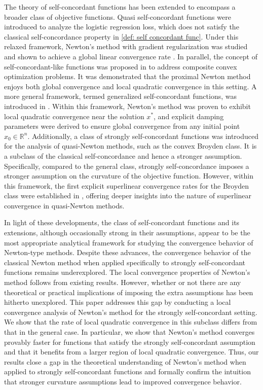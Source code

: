\documentclass[sn-mathphys-num]{sn-jnl}%
\theoremstyle{thmstyleone}%
\theoremstyle{thmstyletwo}%
\theoremstyle{thmstylethree}%
\numberwithin{equation}{section}
\begin{document}
The theory of self-concordant functions has been extended to encompass a broader class of objective functions. Quasi self-concordant functions were introduced to analyze the logistic regression loss, which does not satisfy the classical self-concordance property in \eqref{def: self concordant func}. Under this relaxed framework, Newton’s method with gradient regularization was studied and shown to achieve a global linear convergence rate \cite{doikov2023minimizing}. In parallel, the concept of self-concordant-like functions was proposed in \cite{tran2015self-concordant-like} to address composite convex optimization problems. 
It was demonstrated that the proximal Newton method enjoys both global convergence and local quadratic convergence in this setting. A more general framework, termed generalized self-concordant functions, was introduced in \cite{sun2019generalized}. 
Within this framework, Newton's method was proven to exhibit local quadratic convergence near the solution $x^*$, and explicit damping parameters were derived to ensure global convergence from any initial point $x_0 \in \mathbb{R}^n$. Additionally, a class of strongly self-concordant functions was introduced for the analysis of quasi-Newton methods, such as the convex Broyden class. It is a subclass of the classical self-concordance and hence a stronger assumption. Specifically, compared to the general class, strongly self-concordance imposes a stronger assumption on the curvature of the objective function. However, within this framework, the first explicit superlinear convergence rates for the Broyden class were established in \cite{rodomanov2021greedy}, offering deeper insights into the nature of superlinear convergence in quasi-Newton methods.

In light of these developments, the class of self-concordant functions and its extensions, although occasionally strong in their assumptions, appear to be the most appropriate analytical framework for studying the convergence behavior of Newton-type methods. Despite these advances, the convergence behavior of the classical Newton method when applied specifically to strongly self-concordant functions remains underexplored. The local convergence properties of Newton's method follows from existing results. However, whether or not there are any theoretical or practical implications of imposing the extra assumptions has been hitherto unexplored. This paper addresses this gap by conducting a local convergence analysis of Newton's method for the strongly self-concordant setting. We show that the rate of local quadratic convergence in this subclass differs from that in the general case. In particular, we show that Newton’s method converges provably faster for functions that satisfy the strongly self-concordant assumption and that it benefits from a larger region of local quadratic convergence. Thus, our results close a gap in the theoretical understanding of Newton’s method when applied to strongly self-concordant functions and formally confirm the intuition that stronger curvature assumptions lead to improved convergence behavior.
\end{document}
